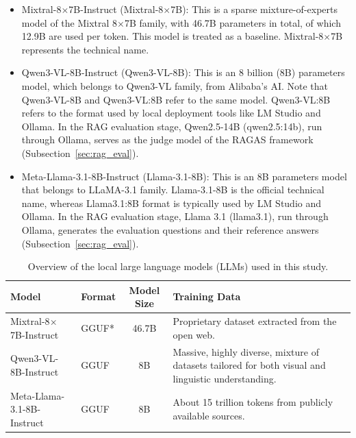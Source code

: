 \documentclass[bdcc,article,submit,pdftex,moreauthors]{Definitions/mdpi}
\begin{document}
\begin{itemize}
\item	Mixtral-8$\times$7B-Instruct (Mixtral-8$\times$7B): %
This is a sparse mixture-of-experts model of the Mixtral 8$\times$7B family, with 46.7B parameters in total, of which 12.9B are used per token. This model is treated as a baseline. Mixtral-8$\times$7B represents the technical name.
\item	Qwen3-VL-8B-Instruct (Qwen3-VL-8B): This is an 8 billion (8B) parameters model, which belongs to Qwen3-VL family, from Alibaba’s AI. Note that Qwen3-VL-8B and Qwen3-VL:8B refer to the same model. %
Qwen3-VL:8B refers to the format used by local deployment tools like LM Studio and Ollama. 
In the RAG evaluation stage, Qwen2.5-14B (qwen2.5:14b), run through Ollama, serves as the judge model of the RAGAS framework (Subsection~\ref{sec:rag_eval}).
\item	Meta-Llama-3.1-8B-Instruct (Llama-3.1-8B): This is an 8B parameters model that belongs to LLaMA-3.1 family. Llama-3.1-8B is the official technical name, whereas Llama3.1:8B  format is typically used by LM Studio and Ollama. %
In the RAG evaluation stage, Llama 3.1 (llama3.1), run through Ollama, generates the evaluation questions and their reference answers (Subsection~\ref{sec:rag_eval}).
\end{itemize}

\begin{table}[H]
\centering
\caption{Overview of the local large language models (LLMs) used in this study.}
\label{tab:local_LLMs}
\renewcommand{\arraystretch}{1.2}
\begin{tabularx}{\textwidth}{llcX}
\toprule
\textbf{Model} & \textbf{Format} & \textbf{Model Size} & \textbf{Training Data} \\
\midrule
Mixtral-8$\times$7B-Instruct & GGUF*
& 46.7B 
& Proprietary dataset extracted from the open web. \\
\midrule
Qwen3-VL-8B-Instruct & GGUF
& 8B 
& Massive, highly diverse, mixture of datasets tailored for both visual and linguistic understanding. \\
\midrule
Meta-Llama-3.1-8B-Instruct & GGUF
& 8B 
& About 15 trillion tokens from publicly available sources. \\
\bottomrule
\end{tabularx}
\end{table}
\end{document}
